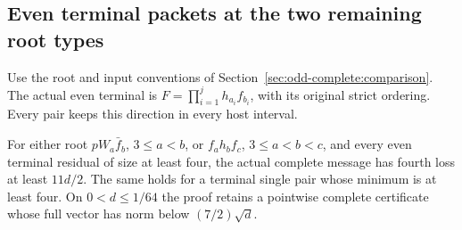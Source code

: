 \subsection{Even terminal packets at the two remaining root types}
\label{sec:odd-even:roots}

Use the root and input conventions of
Section~\ref{sec:odd-complete:comparison}. The actual even terminal is
$F=\prod_{i=1}^j h_{a_i}f_{b_i}$, with its original strict ordering.
Every pair keeps this direction in every host interval.

\begin{proposition}\label{prop:odd-even:roots}
For either root $pW_a\bar f_b$, $3\le a<b$, or
$f_a h_bf_c$, $3\le a<b<c$, and every even terminal residual of
size at least four, the actual complete message has fourth loss
at least $11d/2$. The same holds for a terminal single pair whose
minimum is at least four.
On $0<d\le1/64$ the proof retains a pointwise complete certificate
whose full vector has norm below $(7/2)\sqrt d$.
\end{proposition}
